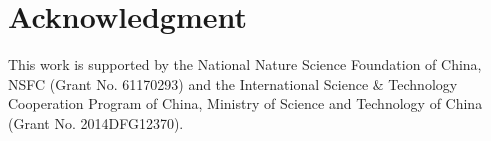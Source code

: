 \documentclass[journal]{IEEEtran}
\begin{document}

\section*{Acknowledgment}

This work is supported by the National Nature Science Foundation of China, NSFC (Grant No. 61170293) and the International Science \& Technology Cooperation Program of China, Ministry of Science and Technology of China (Grant No. 2014DFG12370).

\ifCLASSOPTIONcaptionsoff
  \newpage
\fi





%
%
%
\end{document}

